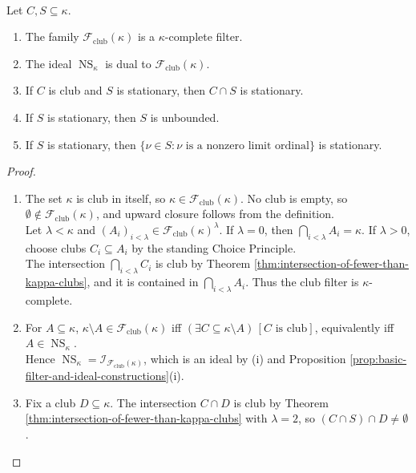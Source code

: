 \begin{proposition} \label{prop:club-filter-completeness-and-stationary-basics} \\
Let $C,S\subseteq\kappa$.
\begin{enumerate}[label=(\roman*)]
\setlength{\itemsep}{0pt}
\item The family $\mathcal{F}_{\mathrm{club}}(\kappa)$ is a $\kappa$-complete filter.
\item The ideal $\operatorname{NS}_{\kappa}$ is dual to $\mathcal{F}_{\mathrm{club}}(\kappa)$.
\item If $C$ is club and $S$ is stationary, then $C\cap S$ is stationary.
\item If $S$ is stationary, then $S$ is unbounded.
\item If $S$ is stationary, then $\{\nu\in S:\nu\text{ is a nonzero limit ordinal}\}$ is stationary.
\end{enumerate}
\begin{proof}
\begin{enumerate}[label=(\roman*)]
\setlength{\itemsep}{0pt}
\item The set $\kappa$ is club in itself, so $\kappa\in\mathcal{F}_{\mathrm{club}}(\kappa)$. No club is empty, so $\emptyset\notin\mathcal{F}_{\mathrm{club}}(\kappa)$, and upward closure follows from the definition.\\
Let $\lambda<\kappa$ and $(A_i)_{i<\lambda}\in\mathcal{F}_{\mathrm{club}}(\kappa)^\lambda$. If $\lambda=0$, then $\bigcap\limits_{i<\lambda}A_i=\kappa$. If $\lambda>0$, choose clubs $C_i\subseteq A_i$ by the standing Choice Principle.\\
The intersection $\bigcap\limits_{i<\lambda}C_i$ is club by Theorem \ref{thm:intersection-of-fewer-than-kappa-clubs}, and it is contained in $\bigcap\limits_{i<\lambda}A_i$. Thus the club filter is $\kappa$-complete.
\item For $A\subseteq\kappa$, $\kappa\setminus A\in\mathcal{F}_{\mathrm{club}}(\kappa)$ iff $(\exists C\subseteq\kappa\setminus A)\,[C\text{ is club}]$, equivalently iff $A\in\operatorname{NS}_{\kappa}$.\\
Hence $\operatorname{NS}_{\kappa}=\mathcal{I}_{\mathcal{F}_{\mathrm{club}}(\kappa)}$, which is an ideal by (i) and Proposition \ref{prop:basic-filter-and-ideal-constructions}(i).
\item Fix a club $D\subseteq\kappa$. The intersection $C\cap D$ is club by Theorem \ref{thm:intersection-of-fewer-than-kappa-clubs} with $\lambda=2$, so $(C\cap S)\cap D\neq\emptyset$.\\

\end{enumerate}
\end{proof}
\end{proposition}
